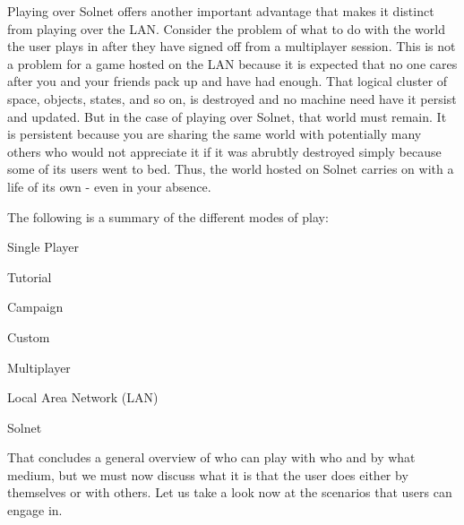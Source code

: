 Playing over Solnet offers another important advantage that makes it distinct from playing over the LAN. Consider the problem of what to do with the world the user plays in after they have signed off from a multiplayer session. This is not a problem for a game hosted on the LAN because it is expected that no one cares after you and your friends pack up and have had enough. That logical cluster of space, objects, states, and so on, is destroyed and no machine need have it persist and updated. But in the case of playing over Solnet, that world must remain. It is persistent because you are sharing the same world with potentially many others who would not appreciate it if it was abrubtly destroyed simply because some of its users went to bed. Thus, the world hosted on Solnet carries on with a life of its own - even in your absence.

The following is a summary of the different modes of play:

\startitemize[4]
    \item Single Player
        \startitemize[4]
        \item Tutorial
        \item Campaign
        \item Custom
        \stopitemize

    \item Multiplayer
        \startitemize[4]
        \item Local Area Network (LAN)
        \item Solnet
        \stopitemize
\stopitemize

That concludes a general overview of who can play with who and by what medium, but we must now discuss what it is that the user does either by themselves or with others. Let us take a look now at the scenarios that users can engage in.

